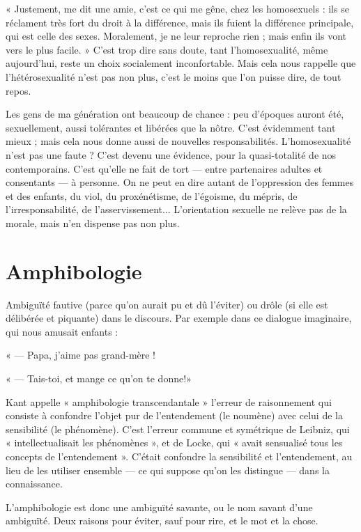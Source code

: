 « Justement, me dit une amie, c’est ce qui me gêne, chez les homosexuels :
ils se réclament très fort du droit à la différence, mais ils fuient la différence
principale, qui est celle des sexes. Moralement, je ne leur reproche rien ; mais
enfin ils vont vers le plus facile. » C’est trop dire sans doute, tant l’homosexualité,
même aujourd’hui, reste un choix socialement inconfortable. Mais
cela nous rappelle que l’hétérosexualité n’est pas non plus, c’est le moins que
l’on puisse dire, de tout repos.

Les gens de ma génération ont beaucoup de chance : peu d’époques auront
été, sexuellement, aussi tolérantes et libérées que la nôtre. C’est évidemment
tant mieux ; mais cela nous donne aussi de nouvelles responsabilités. L’homosexualité
n’est pas une faute ? C’est devenu une évidence, pour la quasi-totalité
de nos contemporains. C’est qu’elle ne fait de tort — entre partenaires adultes et
consentants — à personne. On ne peut en dire autant de l'oppression des
femmes et des enfants, du viol, du proxénétisme, de l’égoisme, du mépris, de
l’irresponsabilité, de l’asservissement... L'orientation sexuelle ne relève pas de
la morale, mais n’en dispense pas non plus.

\section{Amphibologie}
Ambiguïté fautive (parce qu’on aurait pu et dû l’éviter) ou
drôle (si elle est délibérée et piquante) dans le discours.
Par exemple dans ce dialogue imaginaire, qui nous amusait enfants :

« — Papa, j'aime pas grand-mère !

« — Tais-toi, et mange ce qu’on te donne!»

Kant appelle « amphibologie transcendantale » l'erreur de raisonnement
qui consiste à confondre l’objet pur de l’entendement (le noumène) avec celui
de la sensibilité (le phénomène). C’est l’erreur commune et symétrique de Leibniz,
qui « intellectualisait les phénomènes », et de Locke, qui « avait sensualisé
tous les concepts de l’entendement ». C’était confondre la sensibilité et l’entendement,
au lieu de les utiliser ensemble — ce qui suppose qu’on les distingue —
dans la connaissance.

L’amphibologie est donc une ambiguïté savante, ou le nom savant d’une
ambiguïté. Deux raisons pour éviter, sauf pour rire, et le mot et la chose.

